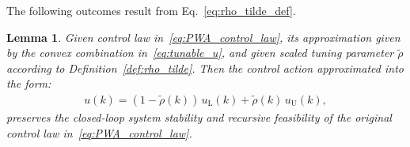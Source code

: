 \documentclass[preprint,12pt]{elsarticle}
\newtheorem{lemma}{Lemma}[theorem]
\newtheorem{corollary}{Corollary}[theorem]
\begin{document}
	The following outcomes result from Eq.~\eqref{eq:rho_tilde_def}. 
	\begin{lemma}
		\label{lem:PWA_control_law_interval}
		Given control law in~\eqref{eq:PWA_control_law}, its approximation given by the convex combination in~\eqref{eq:tunable_u}, and given scaled tuning parameter $\widetilde{\rho}$ according to Definition~\ref{def:rho_tilde}. Then the control action approximated into the form:
		\begin{eqnarray}
			\label{eq:PWA_control_law_interval}
			u(k) = (1-\widetilde{\rho}(k)) \, u_\mathrm{L}(k) + \widetilde{\rho}(k) \, u_\mathrm{U}(k),
		\end{eqnarray}
		preserves the closed-loop system stability and recursive feasibility of the original control law in~\eqref{eq:PWA_control_law}.
	\end{lemma}
	
\end{document}
